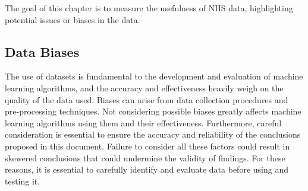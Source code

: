 The goal of this chapter is to measure the usefulness of NHS data, highlighting potential issues or biases in the data.

\subsection{Data Biases}
The use of datasets is fundamental to the development and evaluation of machine learning algorithms, and the accuracy and effectiveness heavily weigh on the quality of the data used. Biases can arise from data collection procedures and pre-processing techniques. Not considering possible biases greatly affects machine learning algorithms using them and their effectiveness. Furthermore, careful consideration is essential to ensure the accuracy and reliability of the conclusions proposed in this document. Failure to consider all these factors could result in skewered conclusions that could undermine the validity of findings. For these reasons, it is essential to carefully identify and evaluate data before using and testing it.

